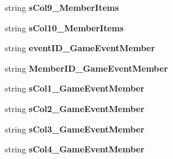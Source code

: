 \begin{DoxyCompactItemize}
\item 
string {\bfseries s\+Col9\+\_\+\+Member\+Items}\hypertarget{a00108_abf91a470b0e48a3bd2c5d0b684b4053d}{}\label{a00108_abf91a470b0e48a3bd2c5d0b684b4053d}

\item 
string {\bfseries s\+Col10\+\_\+\+Member\+Items}\hypertarget{a00108_a508005ea98247a7880a2c47d1797d045}{}\label{a00108_a508005ea98247a7880a2c47d1797d045}

\item 
string {\bfseries event\+I\+D\+\_\+\+Game\+Event\+Member}\hypertarget{a00108_a21f0cadb396da22e70c0af3399597832}{}\label{a00108_a21f0cadb396da22e70c0af3399597832}

\item 
string {\bfseries Member\+I\+D\+\_\+\+Game\+Event\+Member}\hypertarget{a00108_a5f25c862487250230b5755fec9333eee}{}\label{a00108_a5f25c862487250230b5755fec9333eee}

\item 
string {\bfseries s\+Col1\+\_\+\+Game\+Event\+Member}\hypertarget{a00108_aeae9a42a960399d83a1ba5d1f6b4671c}{}\label{a00108_aeae9a42a960399d83a1ba5d1f6b4671c}

\item 
string {\bfseries s\+Col2\+\_\+\+Game\+Event\+Member}\hypertarget{a00108_a5b0a005b52dd3e90067919d978b31a71}{}\label{a00108_a5b0a005b52dd3e90067919d978b31a71}

\item 
string {\bfseries s\+Col3\+\_\+\+Game\+Event\+Member}\hypertarget{a00108_a8895ce7f38927cfeacaf7153ab82d1fb}{}\label{a00108_a8895ce7f38927cfeacaf7153ab82d1fb}

\item 
string {\bfseries s\+Col4\+\_\+\+Game\+Event\+Member}\hypertarget{a00108_a3727d9ab67954ba45acaefc0fb9148ee}{}\label{a00108_a3727d9ab67954ba45acaefc0fb9148ee}


\end{DoxyCompactItemize}
